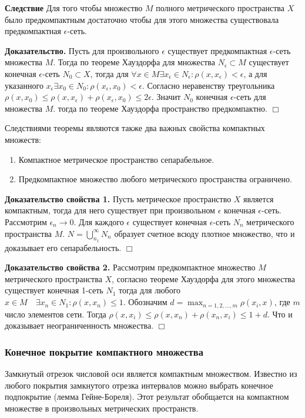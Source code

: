 \documentclass[14pt]{extarticle}
\theoremstyle{definition}
\theoremstyle{remark}
\newcommand{\be}{\begin{enumerate}}
\newcommand{\ee}{\end{enumerate}}
\renewcommand{\[}{\begin{dmath*}[compact]}
\renewcommand{\]}{\end{dmath*}}
\newcommand{\btev}[1][]{\textbf{Доказательство#1.}
}
\newcommand{\etev}{$\Box$}
\begin{document}
\textbf{Следствие} Для того чтобы множество $M$ полного метрического пространства $X$ было предкомпактным достаточно чтобы для этого множества существовала предкомпактная $\epsilon$-сеть.

\btev[] Пусть для произвольного $\epsilon$ существует предкомпактная $\epsilon$-сеть множества $M$. Тогда по теореме Хауздорфа для множества $N_\epsilon \subset M$ существует конечная $\epsilon$-сеть $N_0 \subset X$, тогда для $\forall x \in M \exists x_\epsilon \in N_\epsilon: \rho(x,x_\epsilon) < \epsilon$, а для указанного $x_\epsilon \exists x_0\in N_0: \rho(x_\epsilon,x_0)<\epsilon$. Согласно неравенству треугольника $\rho(x,x_0)\leq \rho(x,x_\epsilon) + \rho(x_\epsilon,x_0) \leq 2\epsilon$. Значит $N_0$ конечная $\epsilon$-сеть для множества $M$. тогда по теореме Хауздорфа пространство предкомпактно. \etev

Следствиями теоремы являются также два важных свойства компактных множеств:

\be
  \item Компактное метрическое пространство сепарабельное.
  \item Предкомпактное множество любого метрического пространства ограничено.
\ee

\btev[ свойства 1] Пусть метрическое пространство $X$ является компактным, тогда для него существует при произвольном $\epsilon$ конечная $\epsilon$-сеть. Рассмотрим $\epsilon_n \to 0$. Для каждого $\epsilon$ существует конечная $\epsilon$-сеть $N_n$ метрического пространства $M$. $N=\bigcup _{n_1}^{\infty} N_n$ образует счетное всюду плотное множество, что и доказывает его сепарабельность. \etev

\btev[ свойства 2] Рассмотрим предкомпактное множество $M$ метрического пространства $X$, согласно теореме Хауздорфа для этого множества существует конечная 1-сеть $N_1$ тогда для любого $x \in M\quad \exists x_n \in N_1: \rho(x, x_n) \leq 1$. Обозначим $d=\max_{n=1,2,\dots,m}\rho(x_i,x)$, где $m$ число элементов сети. Тогда $\rho(x, x_i) \leq \rho(x, x_n)+\rho(x_n, x_i) \leq 1+d$. Что и доказывает неограниченность множества. \etev

\subsubsection{Конечное покрытие компактного множества}

Замкнутый отрезок числовой оси является компактным множеством. Известно из любого покрытия замкнутого отрезка интервалов можно выбрать конечное подпокрытие (лемма Гейне-Бореля). Этот результат обобщается на компактном множестве в произвольных метрических пространств.
\end{document}
